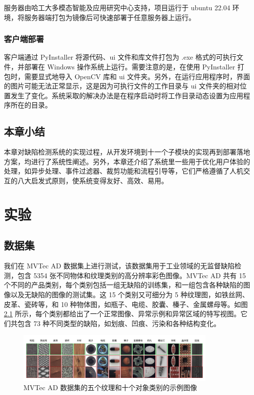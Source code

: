 \documentclass[
  ]{njuthesis}
\begin{document}
服务器由哈工大多模态智能及应用研究中心支持，项目运行于 ubuntu 22.04 环境，将服务器端打包为镜像后可快速部署于任意服务器上运行。

\subsection{客户端部署}

客户端通过 PyInstaller 将源代码、ui 文件和库文件打包为 .exe 格式的可执行文件，并部署在 Windows 操作系统上运行。需要注意的是，在使用 PyInstaller 打包时，需要显式地导入 OpenCV 库和 ui 文件夹。另外，在运行应用程序时，界面的图片可能无法正常显示，这是因为可执行文件的工作目录与 ui 文件夹的相对位置发生了变化。系统采取的解决办法是在程序启动时将工作目录动态设置为应用程序所在的目录。

\section{本章小结}

本章对缺陷检测系统的实现过程，从开发环境到十一个子模块的实现再到部署落地方案，均进行了系统性阐述。另外，本章还介绍了系统里一些用于优化用户体验的处理，如异步处理、事件过滤器、裁剪功能和流程引导等，它们严格遵循了人机交互的八大启发式原则，使系统变得友好、高效、易用。

\chapter{实验}

\section{数据集}

我们在 MVTec AD\cite{[16]} 数据集上进行测试，该数据集用于工业领域的无监督缺陷检测，包含 5354 张不同物体和纹理类别的高分辨率彩色图像。MVTec AD 共有 15 个不同的产品类别，每个类别包括一组无缺陷的训练集，和一组包含各种缺陷的图像以及无缺陷的图像的测试集。这 15 个类别又可细分为 5 种纹理图，如铁丝网、皮革、瓷砖等，和 10 种物体图，如瓶子、电缆、胶囊、榛子、金属螺母等。如图 \ref{MVTec} 所示，每个类别都给出了一个正常图像、异常示例和异常区域的特写视图。它们共包含 73 种不同类型的缺陷，如划痕、凹痕、污染和各种结构变化。

\begin{figure}[htb]
    \centering
    \includegraphics[width=0.88\textwidth]{images/MVTec.png}
    \caption{MVTec AD 数据集的五个纹理和十个对象类别的示例图像}
    \label{MVTec}
\end{figure}
\end{document}
